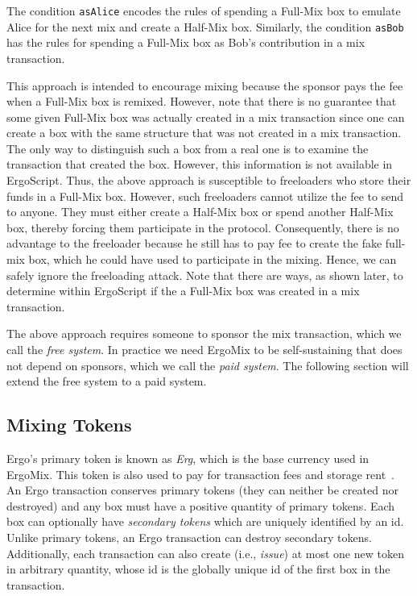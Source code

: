 \documentclass[runningheads]{llncs}
\newcommand{\langname}{ErgoScript\xspace}
\newcommand{\mixname}{ErgoMix\xspace}
\begin{document}
The condition \texttt{asAlice} encodes the rules of spending a Full-Mix box to emulate Alice for the next mix and create a Half-Mix box. Similarly, the condition \texttt{asBob} has the rules for spending a Full-Mix box as Bob's contribution in a mix transaction. 

This approach is intended to encourage mixing because the sponsor pays the fee when a Full-Mix box is remixed. However, note that there is no guarantee that some given Full-Mix box was actually created in a mix transaction since one can create a box with the same structure that was not created in a mix transaction. The only way to distinguish such a box from a real one is to examine the transaction that created the box. However, this information is not available in \langname. Thus, the above approach is susceptible to freeloaders who store their funds in a Full-Mix box. However, such freeloaders cannot utilize the fee to send to anyone. They must either create a Half-Mix box or spend another Half-Mix box, thereby forcing them participate in the protocol. Consequently, there is no advantage to the freeloader because he still has to pay fee to create the fake full-mix box, which he could have used to participate in the mixing. Hence, we can safely ignore the freeloading attack. Note that there are ways, as shown later, to determine within \langname if the a Full-Mix box was created in a mix transaction.

The above approach requires someone to sponsor the mix transaction, which we call the {\em free system}. In practice we need \mixname to be self-sustaining that does not depend on sponsors, which we call the {\em paid system}. 
The following section will extend the free system to a paid system. 

\subsection{Mixing Tokens}

Ergo's primary token is known as {\em Erg}, which is the base currency used in \mixname. This token is also used to pay for transaction fees and storage rent~\cite{chepurnoy2018systematic}. An Ergo transaction conserves primary tokens (they can neither be created nor destroyed) and any box must have a positive quantity of primary tokens.
Each box can optionally have {\em secondary tokens} which are uniquely identified by an id. Unlike primary tokens, an Ergo transaction can destroy secondary tokens. Additionally, each transaction can also create (i.e., {\em issue}) at most one new token in arbitrary quantity, whose id is the globally unique id of the first box in the transaction. 
\end{document}
